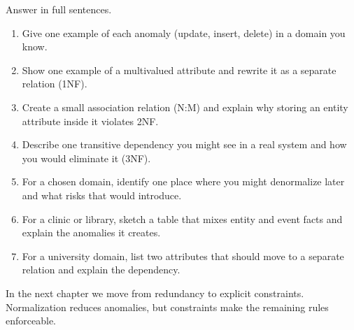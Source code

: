\begin{exercisebox}
Answer in full sentences.
\begin{enumerate}[label=\arabic*.]
  \item Give one example of each anomaly (update, insert, delete) in a domain you know.
  \item Show one example of a multivalued attribute and rewrite it as a separate relation (1NF).
  \item Create a small association relation (N:M) and explain why storing an entity attribute inside it violates 2NF.
  \item Describe one transitive dependency you might see in a real system and how you would eliminate it (3NF).
  \item For a chosen domain, identify one place where you might denormalize later and what risks that would introduce.
  \item For a clinic or library, sketch a table that mixes entity and event facts and explain the anomalies it creates.
  \item For a university domain, list two attributes that should move to a separate relation and explain the dependency.
\end{enumerate}
\end{exercisebox}

In the next chapter we move from redundancy to explicit constraints.
Normalization reduces anomalies, but constraints make the remaining rules enforceable.
